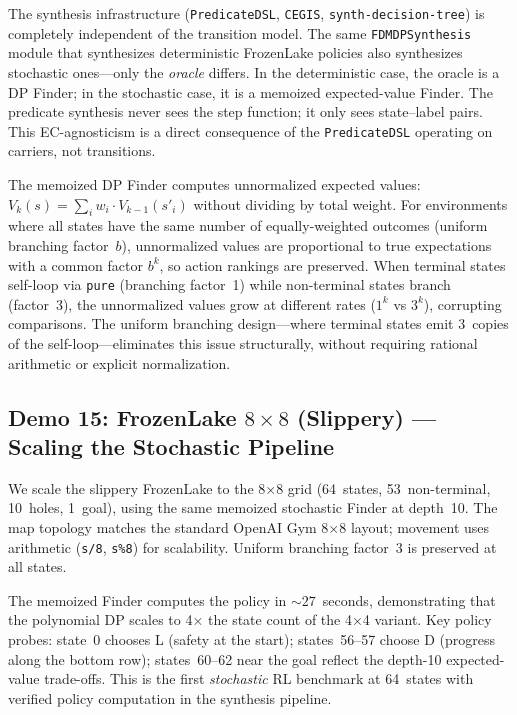 \begin{remark}
The synthesis infrastructure (\texttt{PredicateDSL}, \texttt{CEGIS}, \texttt{synth-decision-tree}) is completely independent of the transition model.
The same \texttt{FDMDPSynthesis} module that synthesizes deterministic FrozenLake policies also synthesizes stochastic ones---only the \emph{oracle} differs.
In the deterministic case, the oracle is a DP Finder; in the stochastic case, it is a memoized expected-value Finder.
The predicate synthesis never sees the step function; it only sees state--label pairs.
This EC-agnosticism is a direct consequence of the \texttt{PredicateDSL} operating on carriers, not transitions.
\end{remark}

\begin{remark}
The memoized DP Finder computes unnormalized expected values: $V_k(s) = \sum_i w_i \cdot V_{k-1}(s'_i)$ without dividing by total weight.
For environments where all states have the same number of equally-weighted outcomes (uniform branching factor~$b$), unnormalized values are proportional to true expectations with a common factor $b^k$, so action rankings are preserved.
When terminal states self-loop via \texttt{pure} (branching factor~1) while non-terminal states branch (factor~3), the unnormalized values grow at different rates ($1^k$ vs $3^k$), corrupting comparisons.
The uniform branching design---where terminal states emit 3~copies of the self-loop---eliminates this issue structurally, without requiring rational arithmetic or explicit normalization.
\end{remark}

\subsection{Demo 15: FrozenLake \texorpdfstring{$8 \times 8$}{8x8} (Slippery) --- Scaling the Stochastic Pipeline}
\label{sec:e2e-frozenlake-8x8-slippery}

We scale the slippery FrozenLake to the 8×8 grid (64~states, 53~non-terminal, 10~holes, 1~goal), using the same memoized stochastic Finder at depth~10.
The map topology matches the standard OpenAI Gym 8×8 layout; movement uses arithmetic (\texttt{s/8}, \texttt{s\%8}) for scalability.
Uniform branching factor~3 is preserved at all states.

The memoized Finder computes the policy in ${\sim}27$~seconds, demonstrating that the polynomial DP scales to 4× the state count of the 4×4 variant.
Key policy probes: state~0 chooses L (safety at the start); states~56--57 choose D (progress along the bottom row); states~60--62 near the goal reflect the depth-10 expected-value trade-offs.
This is the first \emph{stochastic} RL benchmark at 64~states with verified policy computation in the synthesis pipeline.

